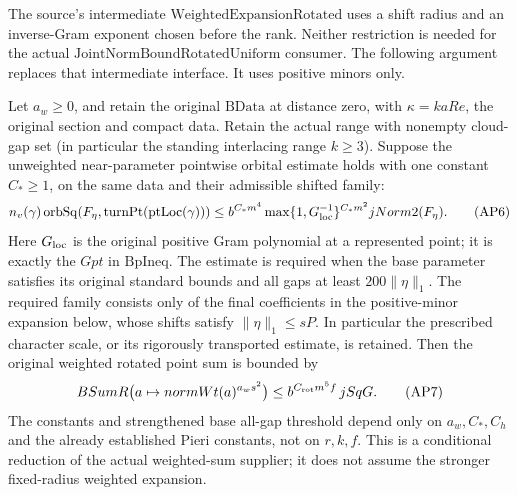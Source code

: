 The source's intermediate \(\mathrm{WeightedExpansionRotated}\)
uses a shift radius and an inverse-Gram exponent chosen
before the rank. Neither restriction is needed for the
actual \(\mathrm{JointNormBoundRotatedUniform}\) consumer.
The following argument replaces that intermediate
interface. It uses positive minors only.

\begin{theorem}
\label{thm:rotated-sum-from-near-bp}
Let \(a_w\ge0\), and retain the original
\(\mathrm{BData}\) at distance zero, with
\(\kappa=kaRe\), the original section and compact data.
Retain the actual range with nonempty cloud-gap set
(in particular the standing interlacing range \(k\ge3\)).
Suppose the unweighted near-parameter pointwise
orbital estimate holds with one constant \(C_*\ge1\),
on the same data and their admissible shifted family:
\[
 n_v(\gamma)\operatorname{orbSq}(F_\eta,
                  \mathrm{turnPt}(\mathrm{ptLoc}(\gamma)))
 \le b^{C_*m^4}
   \max\{1,G_{\rm loc}^{-1}\}^{C_*m^2}jNorm2(F_\eta).
                                                        \tag{AP6}
\]
Here \(G_{\rm loc}\) is the original positive Gram
polynomial at a represented point; it is exactly the
\(Gpt\) in \(\mathrm{BpIneq}\). The estimate is required
when the base parameter satisfies its original standard
bounds and all gaps at least \(200\|\eta\|_1\).
The required family consists only of the final coefficients in
the positive-minor expansion below, whose shifts satisfy
\(\|\eta\|_1\le sP\). In particular the prescribed character
scale, or its rigorously transported estimate, is retained.
Then the original weighted rotated point sum is bounded by
\[
 BSumR\bigl(a\mapsto normWt(a)^{a_ws^2}\bigr)
             \le b^{C_{\rm rot}m^5 f}\,jSqG.            \tag{AP7}
\]
The constants and strengthened base all-gap threshold
depend only on \(a_w,C_*,C_h\) and the already established
Pieri constants, not on \(r,k,f\). This is a conditional
reduction of the actual weighted-sum supplier; it does
not assume the stronger fixed-radius weighted expansion.
\end{theorem}

